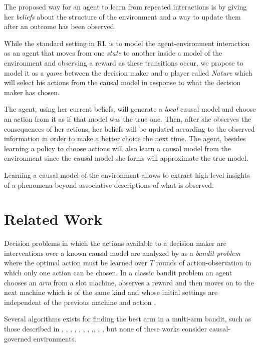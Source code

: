 \documentclass{article}
\begin{document}
The proposed way for an agent to learn from repeated interactions is by giving her \textit{beliefs} about the structure of the environment and a way to update them after an outcome has been observed.

While the standard setting in RL is to model the agent-environment interaction as an agent that moves from one \textit{state} to another inside a model of the environment and observing a reward as these transitions occur, we propose to model it as a \textit{game} between the decision maker and a player called \textit{Nature} which will select his actions from the causal model in response to what the decision maker has chosen. 

The agent, using her current beliefs, will generate a \textit{local} causal model and choose an action from it as if that model was the true one. Then, after she observes the consequences of her actions, her beliefs will be updated according to the observed information in order to make a better choice the next time. The agent, besides learning a policy to choose actions will also learn a causal model from the environment since the causal model she forms will approximate the true model.

Learning a causal model of the environment allows to extract high-level insights of a phenomena beyond associative descriptions of what is observed.

\section{Related Work}
Decision problems in which the actions available to a decision maker are interventions over a known causal model are analyzed by \cite{lattimoreNIPS2016} as a \textit{bandit problem} where the optimal action must be learned over $T$ rounds of action-observation in which only one action can be chosen. In a classic bandit problem an agent chooses an \textit{arm} from a slot machine, observes a reward and then moves on to the next machine which is of the same kind and whose initial settings are independent of the previous machine and action \cite{sutton1998reinforcement}.

Several algorithms exists for finding the best arm in a multi-arm bandit, such as those described in \cite{bubeck2009pure}, \cite{audibert2010best}, \cite{gabillon2012best}, \cite{agarwal2014taming} , \cite{jamieson2014lil},  \cite{jamieson2014best},  \cite{ortega2014generalized}, \cite{chen2015optimal},\cite{carpentier2016tight}, \cite{russo2016simple},  \cite{kaufmann2016complexity}, but none of these works consider causal-governed environments.
\end{document}
